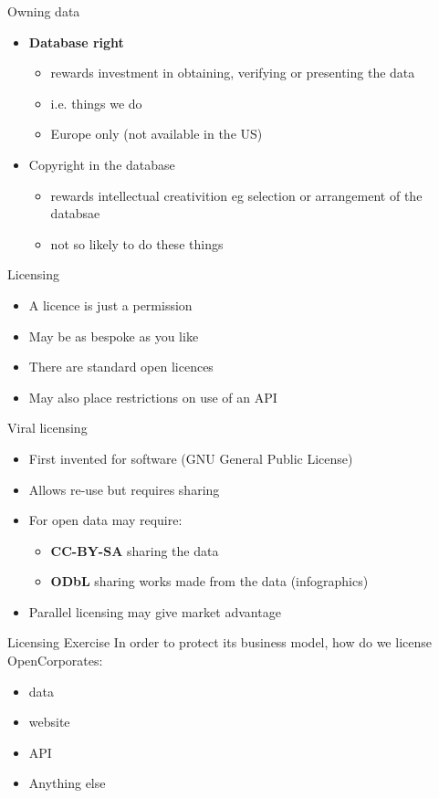 \documentclass{beamer}
\begin{document}
\begin{frame}{Owning data}
  \begin{itemize}
  \item {\bf Database right} 
    \begin{itemize}
    \item rewards investment in obtaining, verifying or presenting the data
    \item i.e. things we do
    \item Europe only (not available in the US)
    \end{itemize}
  \item Copyright in the database
    \begin{itemize}
    \item rewards intellectual creativition eg selection or arrangement of the databsae
    \item not so likely to do these things
    \end{itemize}
\end{itemize}
\end{frame}

\begin{frame}{Licensing}
  \begin{itemize}
  \item A licence is just a permission
  \item May be as bespoke as you like
  \item There are standard open licences
  \item May also place restrictions on use of an API
  \end{itemize}
  
\end{frame}

\begin{frame}{Viral licensing}
  \begin{itemize}
  \item First invented for software (GNU General Public License)
  \item Allows re-use but requires sharing
  \item For open data may require:
    \begin{itemize}
    \item {\bf CC-BY-SA} sharing the data
    \item {\bf ODbL} sharing works made from the data (infographics)
    \end{itemize}
  \item Parallel licensing may give market advantage
  \end{itemize}
\end{frame}

\begin{frame}{Licensing Exercise}
In order to protect its business model, how do we license OpenCorporates:
\begin{itemize}
\item data
\item website
\item API
\item Anything else
\end{itemize}
  
\end{frame}
\end{document}
